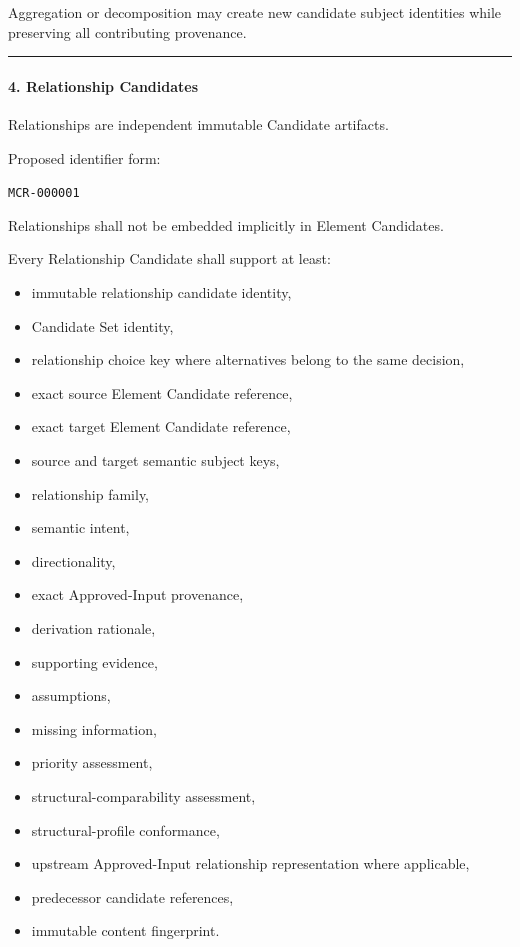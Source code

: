 Aggregation or decomposition may create new candidate subject identities while preserving all contributing provenance.

\begin{center}\rule{0.5\linewidth}{0.5pt}\end{center}

\hypertarget{4-relationship-candidates}{%
\paragraph{4. Relationship Candidates}\label{4-relationship-candidates}}

Relationships are independent immutable Candidate artifacts.

Proposed identifier form:

\texttt{MCR-000001}

Relationships shall not be embedded implicitly in Element Candidates.

Every Relationship Candidate shall support at least:

\begin{itemize}
\tightlist
\item
  immutable relationship candidate identity,
\item
  Candidate Set identity,
\item
  relationship choice key where alternatives belong to the same decision,
\item
  exact source Element Candidate reference,
\item
  exact target Element Candidate reference,
\item
  source and target semantic subject keys,
\item
  relationship family,
\item
  semantic intent,
\item
  directionality,
\item
  exact Approved-Input provenance,
\item
  derivation rationale,
\item
  supporting evidence,
\item
  assumptions,
\item
  missing information,
\item
  priority assessment,
\item
  structural-comparability assessment,
\item
  structural-profile conformance,
\item
  upstream Approved-Input relationship representation where applicable,
\item
  predecessor candidate references,
\item
  immutable content fingerprint.
\end{itemize}

